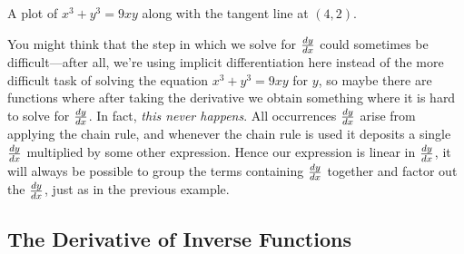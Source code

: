 \begin{marginfigure}[-3in]
\caption{A plot of $x^3+y^3 = 9xy$ along with the tangent line at
  $(4,2)$.}
\label{plot:x^3+y^3=9xy}
\end{marginfigure}

\break

You might think that the step in which we solve for $\frac{dy}{dx}$ could
sometimes be difficult---after all, we're using implicit
differentiation here instead of the more difficult task of solving the
equation $x^3+y^3=9xy$ for $y$, so maybe there are functions where
after taking the derivative we obtain something where it is hard to
solve for $\frac{dy}{dx}$. In fact, \textit{this never happens}. All
occurrences $\frac{dy}{dx}$ arise from applying the chain rule, and whenever
the chain rule is used it deposits a single $\frac{dy}{dx}$ multiplied by some
other expression. Hence our expression is linear in $\frac{dy}{dx}$, it will
always be possible to group the terms containing $\frac{dy}{dx}$ together and
factor out the $\frac{dy}{dx}$, just as in the previous example. 




\subsection*{The Derivative of Inverse Functions}


